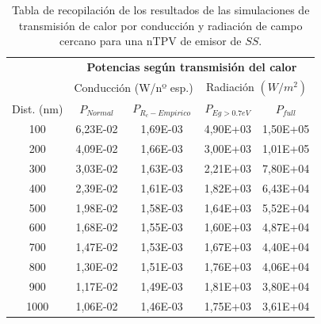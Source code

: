 \begin{table}[h]
	\centering
		\begin{tabular}{|c||c|c||c|c|}
		\hline
\multirow{2}{*}{ }& \multicolumn{4}{c|}{\textbf{\large Potencias según transmisión del calor}}\\ \cline{2-5}
& \multicolumn{2}{c||}{Conducción (W/nº esp.)}& \multicolumn{2}{c|}{Radiación $(W/m^2)$}\\ \hline
Dist. (nm)&$P_{Normal}$&$P_{R_c-Empirico}$&$P_{Eg>0.7eV}$&$P_{full}$\\ \hline \hline
100&6,23E-02&1,69E-03&4,90E+03&1,50E+05\\ \hline 
200&4,09E-02&1,66E-03&3,00E+03&1,01E+05\\ \hline 
300&3,03E-02&1,63E-03&2,21E+03&7,80E+04\\ \hline 
400&2,39E-02&1,61E-03&1,82E+03&6,43E+04\\ \hline 
500&1,98E-02&1,58E-03&1,64E+03&5,52E+04\\ \hline 
600&1,68E-02&1,55E-03&1,60E+03&4,87E+04\\ \hline 
700&1,47E-02&1,53E-03&1,67E+03&4,40E+04\\ \hline 
800&1,30E-02&1,51E-03&1,76E+03&4,06E+04\\ \hline 
900&1,17E-02&1,49E-03&1,81E+03&3,80E+04\\ \hline 
1000&1,06E-02&1,46E-03&1,75E+03&3,61E+04\\ \hline 
		\end{tabular}
	\caption{Tabla de recopilación de los resultados de las simulaciones de transmisión de calor por conducción y radiación de campo cercano para una nTPV de emisor de $SS$.}
	\label{tab:SiCSiO2Ge}
\end{table}

\vfill \newpage
